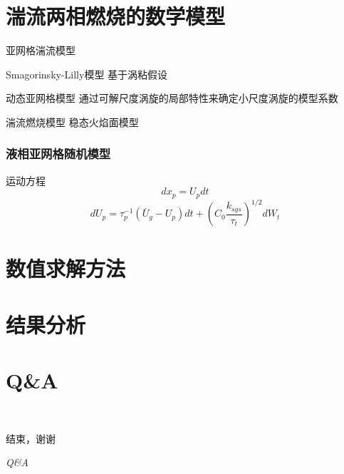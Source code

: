 \documentclass[compress,8pt,t]{beamer}
\begin{document}
\section{湍流两相燃烧的数学模型}
\begin{frame}{亚网格湍流模型}
  \begin{alertblock}{Smagorinsky-Lilly模型}
    基于涡粘假设
  \end{alertblock}
  \begin{exampleblock}{动态亚网格模型}
    通过可解尺度涡旋的局部特性来确定小尺度涡旋的模型系数
  \end{exampleblock}
\end{frame}
\begin{frame}{湍流燃烧模型}
稳态火焰面模型
\end{frame}
\begin{frame}
  \frametitle{液相亚网格随机模型}
  \begin{block}{运动方程}
    $$dx_p=U_pdt$$
  \[dU_p=\tau_p^{-1}( {\overline U}_g-U_p)dt+(C_0\frac{k_{sgs}}{\tau_t})^{1/2}dW_t\]
  \end{block}
\end{frame}
\section{数值求解方法}
\section{结果分析}
\section{Q\&A}
\begin{frame}{\secname~ }
  \begin{center}
    \huge {\kaishu 结束，谢谢}

    \huge \textit {Q\&A}
  \end{center}
\end{frame}
\end{document}
